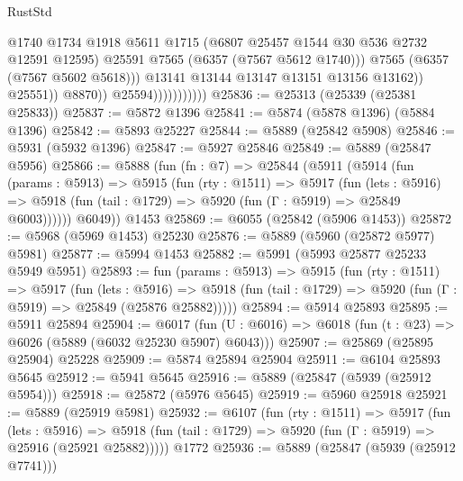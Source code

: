 \begin{lexlean}{RustStd}
\begin{coremodule}
                                          @1740
                                          @1734
                                          @1918
                                          @5611
                                          @1715
                                          (@6807 @25457 @1544 @30 @536 @2732 @12591 @12595)
                                          @25591
                                          @7565
                                          (@6357 (@7567 @5612 @1740)))
                                        @7565
                                        (@6357 (@7567 @5602 @5618)))
                                      @13141
                                      @13144
                                      @13147
                                      @13151
                                      @13156
                                      @13162))
                                  @25551))
                              @8870))
                          @25594)))))))))))
@25836 := @25313 (@25339 (@25381 @25833))
@25837 := @5872 @1396
@25841 := @5874 (@5878 @1396) (@5884 @1396)
@25842 := @5893 @25227
@25844 := @5889 (@25842 @5908)
@25846 := @5931 (@5932 @1396)
@25847 := @5927 @25846
@25849 := @5889 (@25847 @5956)
@25866 := @5888
    (fun (fn : @7) =>
    @25844
      (@5911
        (@5914
          (fun (params : @5913) =>
          @5915
            (fun (rty : @1511) =>
            @5917
              (fun (lets : @5916) =>
              @5918 (fun (tail : @1729) => @5920 (fun (Γ : @5919) => @25849 @6003))))))
        @6049))
    @1453
@25869 := @6055 (@25842 (@5906 @1453))
@25872 := @5968 (@5969 @1453) @25230
@25876 := @5889 (@5960 (@25872 @5977) @5981)
@25877 := @5994 @1453
@25882 := @5991 (@5993 @25877 @25233 @5949 @5951)
@25893 := fun (params : @5913) =>
  @5915
    (fun (rty : @1511) =>
    @5917
      (fun (lets : @5916) =>
      @5918 (fun (tail : @1729) => @5920 (fun (Γ : @5919) => @25849 (@25876 @25882)))))
@25894 := @5914 @25893
@25895 := @5911 @25894
@25904 := @6017
    (fun (U : @6016) => @6018 (fun (t : @23) => @6026 (@5889 (@6032 @25230 @5907) @6043)))
@25907 := @25869 (@25895 @25904) @25228
@25909 := @5874 @25894 @25904
@25911 := @6104 @25893 @5645
@25912 := @5941 @5645
@25916 := @5889 (@25847 (@5939 (@25912 @5954)))
@25918 := @25872 (@5976 @5645)
@25919 := @5960 @25918
@25921 := @5889 (@25919 @5981)
@25932 := @6107
    (fun (rty : @1511) =>
    @5917
      (fun (lets : @5916) =>
      @5918 (fun (tail : @1729) => @5920 (fun (Γ : @5919) => @25916 (@25921 @25882)))))
    @1772
@25936 := @5889 (@25847 (@5939 (@25912 @7741)))

\end{coremodule}
\end{lexlean}
